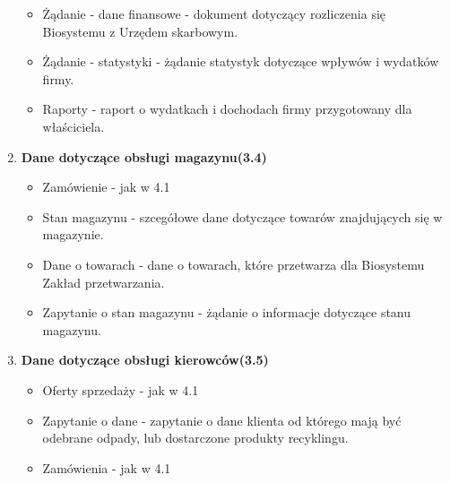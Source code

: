 \begin{enumerate}
\begin{itemize}
		\item Żądanie - dane finansowe - dokument dotyczący rozliczenia się Biosystemu z Urzędem skarbowym. 
		\item Żądanie - statystyki - żądanie statystyk dotyczące wpływów i wydatków firmy.
		\item Raporty - raport o wydatkach i dochodach firmy przygotowany dla właściciela.
	\end{itemize}
\item \textbf{Dane dotyczące obsługi magazynu(3.4)}
	\begin{itemize}
		\item Zamówienie - jak w 4.1
		\item Stan magazynu - szcegółowe dane dotyczące towarów znajdujących się w magazynie.
		\item Dane o towarach - dane o towarach, które przetwarza dla Biosystemu Zakład przetwarzania.
		\item Zapytanie o stan magazynu - żądanie o informacje dotyczące stanu magazynu.
	\end{itemize}
\item \textbf{Dane dotyczące obsługi kierowców(3.5)}
	\begin{itemize}
		\item Oferty sprzedaży - jak w 4.1
		\item Zapytanie o dane - zapytanie o dane klienta od którego mają być odebrane odpady, lub dostarczone produkty recyklingu.
		\item Zamówienia - jak w 4.1
	\end{itemize}
\end{enumerate}
